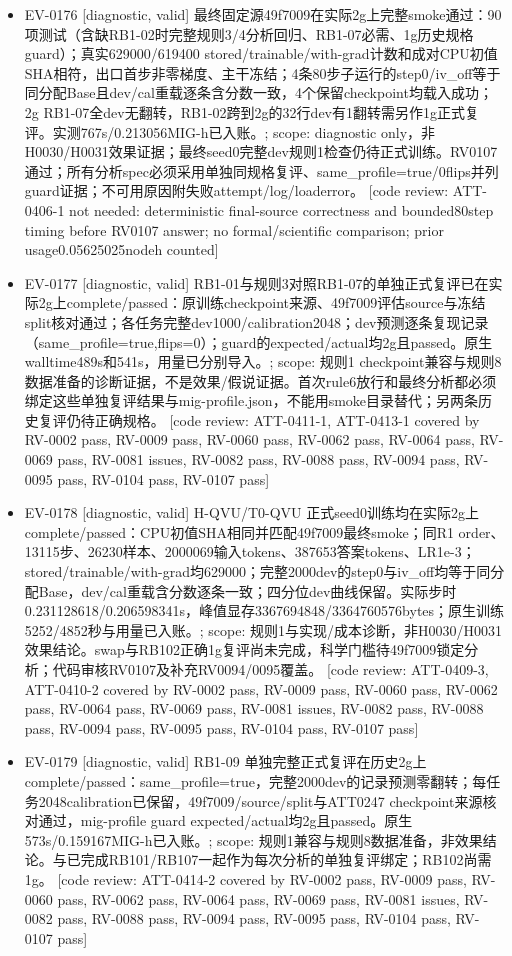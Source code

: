 \documentclass[11pt]{article}
\begin{document}
\begin{itemize}
\item EV-0176 [diagnostic, valid] 最终固定源49f7009在实际2g上完整smoke通过：90项测试（含缺RB1-02时完整规则3/4分析回归、RB1-07必需、1g历史规格guard）；真实629000/619400 stored/trainable/with-grad计数和成对CPU初值SHA相符，出口首步非零梯度、主干冻结；4条80步子运行的step0/iv\_off等于同分配Base且dev/cal重载逐条含分数一致，4个保留checkpoint均载入成功；2g RB1-07全dev无翻转，RB1-02跨到2g的32行dev有1翻转需另作1g正式复评。实测767s/0.213056MIG-h已入账。; scope: diagnostic only，非H0030/H0031效果证据；最终seed0完整dev规则1检查仍待正式训练。RV0107通过；所有分析spec必须采用单独同规格复评、same\_profile=true/0flips并列guard证据；不可用原因附失败attempt/log/loaderror。 [code review: ATT-0406-1 not needed: deterministic final-source correctness and bounded80step timing before RV0107 answer; no formal/scientific comparison; prior usage0.05625025nodeh counted]
\item EV-0177 [diagnostic, valid] RB1-01与规则3对照RB1-07的单独正式复评已在实际2g上complete/passed：原训练checkpoint来源、49f7009评估source与冻结split核对通过；各任务完整dev1000/calibration2048；dev预测逐条复现记录（same\_profile=true,flips=0）；guard的expected/actual均2g且passed。原生walltime489s和541s，用量已分别导入。; scope: 规则1 checkpoint兼容与规则8数据准备的诊断证据，不是效果/假说证据。首次rule6放行和最终分析都必须绑定这些单独复评结果与mig-profile.json，不能用smoke目录替代；另两条历史复评仍待正确规格。 [code review: ATT-0411-1, ATT-0413-1 covered by RV-0002 pass, RV-0009 pass, RV-0060 pass, RV-0062 pass, RV-0064 pass, RV-0069 pass, RV-0081 issues, RV-0082 pass, RV-0088 pass, RV-0094 pass, RV-0095 pass, RV-0104 pass, RV-0107 pass]
\item EV-0178 [diagnostic, valid] H-QVU/T0-QVU 正式seed0训练均在实际2g上complete/passed：CPU初值SHA相同并匹配49f7009最终smoke；同R1 order、13115步、26230样本、2000069输入tokens、387653答案tokens、LR1e-3；stored/trainable/with-grad均629000；完整2000dev的step0与iv\_off均等于同分配Base，dev/cal重载含分数逐条一致；四分位dev曲线保留。实际步时0.231128618/0.206598341s，峰值显存3367694848/3364760576bytes；原生训练5252/4852秒与用量已入账。; scope: 规则1与实现/成本诊断，非H0030/H0031效果结论。swap与RB102正确1g复评尚未完成，科学门槛待49f7009锁定分析；代码审核RV0107及补充RV0094/0095覆盖。 [code review: ATT-0409-3, ATT-0410-2 covered by RV-0002 pass, RV-0009 pass, RV-0060 pass, RV-0062 pass, RV-0064 pass, RV-0069 pass, RV-0081 issues, RV-0082 pass, RV-0088 pass, RV-0094 pass, RV-0095 pass, RV-0104 pass, RV-0107 pass]
\item EV-0179 [diagnostic, valid] RB1-09 单独完整正式复评在历史2g上complete/passed：same\_profile=true，完整2000dev的记录预测零翻转；每任务2048calibration已保留，49f7009/source/split与ATT0247 checkpoint来源核对通过，mig-profile guard expected/actual均2g且passed。原生573s/0.159167MIG-h已入账。; scope: 规则1兼容与规则8数据准备，非效果结论。与已完成RB101/RB107一起作为每次分析的单独复评绑定；RB102尚需1g。 [code review: ATT-0414-2 covered by RV-0002 pass, RV-0009 pass, RV-0060 pass, RV-0062 pass, RV-0064 pass, RV-0069 pass, RV-0081 issues, RV-0082 pass, RV-0088 pass, RV-0094 pass, RV-0095 pass, RV-0104 pass, RV-0107 pass]

\end{itemize}
\end{document}
